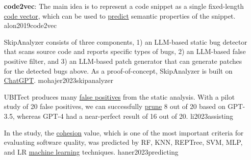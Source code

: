 \documentclass{article}
\begin{document}
  {\textbf{code2vec}: The main idea is to represent a code snippet as a single fixed-length \ul{code vector}, which can be used to \ul{predict} semantic properties of the snippet.}
  {alon2019code2vec}

  {SkipAnalyzer consists of three components, 1) an LLM-based static bug detector that scans source code and reports specific types of bugs, 2) an LLM-based false positive filter, and 3) an LLM-based patch generator that can generate patches for the detected bugs above. As a proof-of-concept, SkipAnalyzer is built on \ul{ChatGPT}.}
  {mohajer2023skipanalyzer}

  {UBITect produces many \ul{false positives} from the static analysis. With a pilot study of 20 false positives, we can successfully \ul{prune} 8 out of 20 based on GPT-3.5, whereas GPT-4 had a near-perfect result of 16 out of 20.}
  {li2023assisting}

  {In the study, the \ul{cohesion} value, which is one of the most important criteria for evaluating software quality, was predicted by RF, KNN, REPTree, SVM, MLP, and LR \ul{machine learning} techniques.}
  {haner2023predicting}

\end{document}
